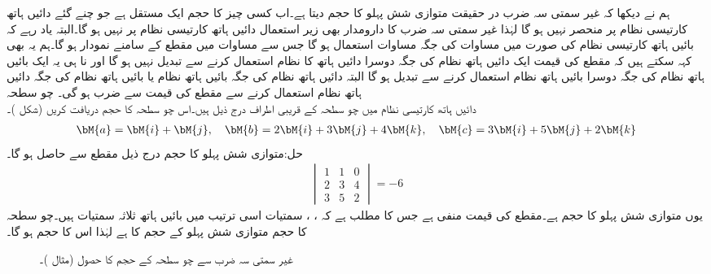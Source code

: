 ہم نے دیکھا کہ غیر سمتی سہ ضرب در حقیقت متوازی شش پہلو کا حجم دیتا ہے۔اب کسی چیز کا حجم ایک مستقل ہے جو چنے گئے دائیں ہاتھ کارتیسی نظام پر منحصر نہیں ہو گا لہٰذا غیر سمتی سہ ضرب کا دارومدار بھی زیر استعمال دائیں ہاتھ کارتیسی  نظام پر نہیں ہو گا۔البتہ یاد رہے کہ بائیں ہاتھ کارتیسی نظام کی صورت میں مساوات  کی جگہ مساوات  استعمال ہو گا جس سے مساوات  میں مقطع کے سامنے  نمودار ہو گا۔ہم یہ بھی کہہ سکتے ہیں کہ مقطع کی قیمت ایک دائیں ہاتھ نظام کی جگہ دوسرا دائیں ہاتھ کا نظام استعمال کرنے سے تبدیل نہیں ہو گا اور نا ہی یہ ایک بائیں ہاتھ نظام کی جگہ دوسرا بائیں ہاتھ نظام استعمال کرنے سے تبدیل ہو گا البتہ دائیں ہاتھ نظام کی جگہ بائیں ہاتھ نظام یا بائیں ہاتھ نظام کی جگہ دائیں ہاتھ نظام استعمال کرنے سے مقطع کی قیمت  سے ضرب ہو گی۔  
\quad چو سطحہ\\
دائیں ہاتھ کارتیسی نظام میں چو سطحہ کے قریبی اطراف درج ذیل ہیں۔اس چو سطحہ کا حجم دریافت کریں (شکل )۔
\begin{align*}
\bM{a}=\bM{i}+\bM{j},\quad \bM{b}=2\bM{i}+3\bM{j}+4\bM{k},\quad \bM{c}=3\bM{i}+5\bM{j}+2\bM{k}
\end{align*}
حل:متوازی شش پہلو کا حجم درج ذیل مقطع سے حاصل ہو گا۔
\begin{align*}
\begin{vmatrix}1&1&0\\2&3&4\\3&5&2  \end{vmatrix}=-6
\end{align*}
یوں متوازی شش پہلو کا حجم  ہے۔مقطع کی قیمت منفی ہے جس کا مطلب ہے کہ ، ،  سمتیات اسی ترتیب میں بائیں ہاتھ ثلاثہ سمتیات ہیں۔چو سطحہ کا حجم متوازی شش پہلو کے حجم کا  ہے لہٰذا اس کا حجم  ہو گا۔
\begin{figure}
\centering
{}
\caption{غیر سمتی سہ ضرب سے چو سطحہ کے حجم کا حصول (مثال )۔}
\label{شکل_مثال_الجبرا_چو_سطحہ}
\end{figure}

